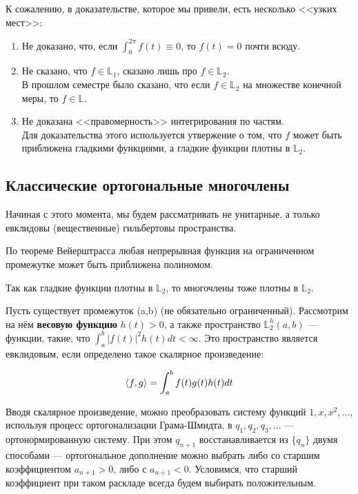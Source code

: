 \documentclass[12pt]{article}
\begin{document}
			К сожалению, в доказательстве, которое мы привели, есть несколько <<узких мест>>:
			\begin{enumerate}
				\item Не доказано, что, если $\int_0^{2\pi} f(t) \equiv 0$, то $f(t) = 0$ почти всюду.
				\item Не сказано, что $f \in \mathbb{L}_1$, сказано лишь про $f \in \mathbb{L}_2$. \\
				В прошлом семестре было сказано, что если $f \in \mathbb{L}_2$ на множестве конечной меры, то $f \in \mathbb{L}$.
				\item Не доказана <<правомерность>> интегрирования по частям. \\
				Для доказательства этого используется утвержение о том, что $f$ может быть приближена гладкими функциями, а
				гладкие функции плотны в $\mathbb{L}_2$.
			\end{enumerate}

	\subsection{Классические ортогональные многочлены}

		Начиная с этого момента, мы будем рассматривать не унитарные, а только евклидовы (вещественные)
		гильбертовы пространства.

		По теореме Вейерштрасса любая непрерывная функция на ограниченном промежутке может быть
		приближена полиномом.

		Так как гладкие функции плотны в $\mathbb{L}_2$, то многочлены тоже плотны в $\mathbb{L}_2$.
	
		Пусть существует промежуток (a,b) (не обязательно ограниченный). Рассмотрим на нём
		\textbf{весовую функцию} $h(t) > 0$, а также пространство $\mathbb{L}_2^h (a,b)$ --- функции,
		такие, что $\int_a^b |f(t)|^2 h(t) dt < \infty$. Это пространство является евклидовым, если
		определено такое скалярное произведение:
			
		$$ \left\langle f, g \right\rangle = \int_a^b f(t) g(t) h(t) dt $$

		Вводя скалярное произведение, можно преобразовать систему функций $1, x, x^2, \ldots$, используя
		процесс ортогонализации Грама-Шмидта, в $q_1, q_2, q_3, \ldots$ --- ортонормированную систему.
		При этом $q_{n+1}$ восстанавливается из $ \{ q_n \} $ двумя способами --- ортогональное
		дополнение можно выбрать либо со старшим коэффициентом $a_{n+1} > 0$, либо с $a_{n+1} < 0$.
		Условимся, что старший коэффициент при таком раскладе всегда будем выбирать положительным.
\end{document}
